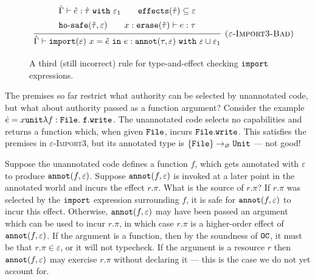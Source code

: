 \begin{figure}[h]

\[
\begin{array}{c}

\infer[\textsc{($\varepsilon$-Import3-Bad)}]
	{ \hat \Gamma \vdash \kwa{import}(\varepsilon)~x = \hat e~\kw{in} e: \kwa{annot}(\tau, \varepsilon)~\kw{with} \varepsilon \cup \varepsilon_1 }
{{\def\arraystretch{1.4}
  \begin{array}{c}
\hat \Gamma \vdash \hat e: \hat \tau~\kw{with} \varepsilon_1
~~~~~~
\kwa{effects}(\hat \tau) \subseteq \varepsilon \\
\hosafe{\hat \tau}{\varepsilon} ~~~~~~ x: \kwa{erase}(\hat \tau) \vdash e: \tau
  \end{array}}} 
 
\end{array}
\]

\vspace{-7pt}
\caption{A third (still incorrect) rule for type-and-effect checking $\mathtt{import}$ expressions.}
\label{fig:import_rule3}
\end{figure}

The premises so far restrict what authority can be selected by unannotated code, but what about authority passed as a function argument? Consider the example $\hat e = {x}{\mathtt{unit}}{\lambda f: { \mathtt{File} }.~\mathtt{f.write}}$. The unannotated code selects no capabilities and returns a function which, when given $\mathtt{File}$, incurs $\mathtt{File.write}$. This satisfies the premises in \textsc{$\varepsilon$-Import3}, but its annotated type is $\{ \mathtt{File} \} \rightarrow_{\varnothing} \mathtt{Unit}$ --- not good!

Suppose the unannotated code defines a function $f$, which gets annotated with $\varepsilon$ to produce $\mathtt{annot}(f, \varepsilon)$. Suppose $\mathtt{annot}(f, \varepsilon)$ is invoked at a later point in the annotated world and incurs the effect $r.\pi$. What is the source of $r.\pi$? If $r.\pi$ was selected by the $\mathtt{import}$ expression surrounding $f$, it is safe for $\mathtt{annot}(f, \varepsilon)$ to incur this effect. Otherwise, $\mathtt{annot}(f, \varepsilon)$ may have been passed an argument which can be used to incur $r.\pi$, in which case $r.\pi$ is a higher-order effect of $\mathtt{annot}(f, \varepsilon)$. If the argument is a function, then by the soundness of $\mathtt{OC}$, it must be that $r.\pi \in \varepsilon$, or it will not typecheck. If the argument is a resource $r$ then $\mathtt{annot}(f, \varepsilon)$ may exercise $r.\pi$ without declaring it --- this is the case we do not yet account for.

